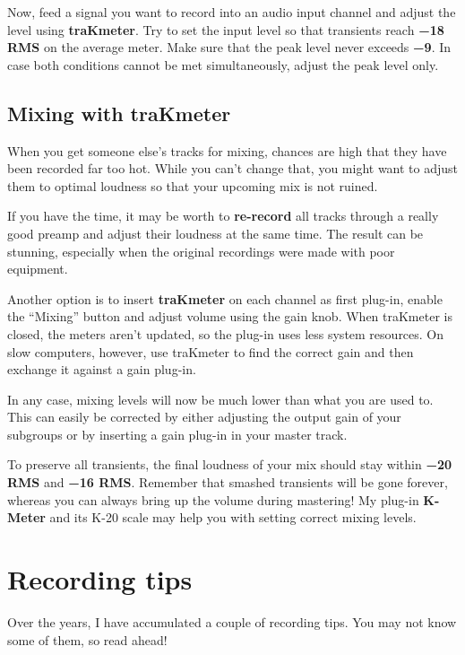 Now, feed a signal you want to record into an audio input channel and
adjust the level using \textbf{traKmeter}.  Try to set the input level
so that transients reach \textbf{\SI{-18}{\dBFS} RMS} on the average
meter.  Make sure that the peak level never exceeds
\textbf{\SI{-9}{\dBFS}}.  In case both conditions cannot be met
simultaneously, adjust the peak level only.

\section{Mixing with traKmeter}
\label{sec:mixing_with_trakmeter}

When you get someone else's tracks for mixing, chances are high that
they have been recorded far too hot.  While you can't change that, you
might want to adjust them to optimal loudness so that your upcoming
mix is not ruined.

If you have the time, it may be worth to \textbf{re-record} all tracks
through a really good preamp and adjust their loudness at the same
time.  The result can be stunning, especially when the original
recordings were made with poor equipment.

Another option is to insert \textbf{traKmeter} on each channel as
first plug-in, enable the ``Mixing'' button and adjust volume using
the gain knob.  When traKmeter is closed, the meters aren't updated,
so the plug-in uses less system resources.  On slow computers,
however, use traKmeter to find the correct gain and then exchange it
against a gain plug-in.

In any case, mixing levels will now be much lower than what you are
used to.  This can easily be corrected by either adjusting the output
gain of your subgroups or by inserting a gain plug-in in your master
track.

To preserve all transients, the final loudness of your mix should stay
within \textbf{\SI{-20}{\dBFS} RMS} and \textbf{\SI{-16}{\dBFS} RMS}.
Remember that smashed transients will be gone forever, whereas you can
always bring up the volume during mastering!  My plug-in
\textbf{K-Meter} and its K-20 scale may help you with setting correct
mixing levels.

\chapter{Recording tips}
\label{chap:recording_tips}

Over the years, I have accumulated a couple of recording tips.  You
may not know some of them, so read ahead!

